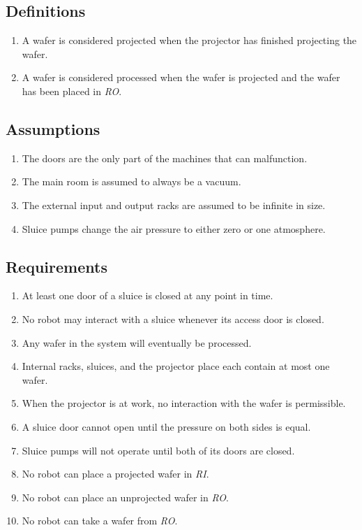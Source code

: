 \subsection{Definitions}
\begin{enumerate}
  \item A wafer is considered projected when the projector has finished projecting the wafer.
  \item A wafer is considered processed when the wafer is projected and the wafer has been placed in \textit{RO}.
\end{enumerate}

\subsection{Assumptions}
\begin{enumerate}
  \item The doors are the only part of the machines that can malfunction.
  \item The main room is assumed to always be a vacuum.
  \item The external input and output racks are assumed to be infinite in size.
  \item Sluice pumps change the air pressure to either zero or one atmosphere.
\end{enumerate}

\subsection{Requirements}
\begin{enumerate}
  \item At least one door of a sluice is closed at any point in time.
  \item No robot may interact with a sluice whenever its access door is closed.
  \item Any wafer in the system will eventually be processed.
  \item Internal racks, sluices, and the projector place each contain at most one wafer.
  \item When the projector is at work, no interaction with the wafer is permissible.
  \item A sluice door cannot open until the pressure on both sides is equal.
  \item Sluice pumps will not operate until both of its doors are closed.
  \item No robot can place a projected wafer in \textit{RI}.
  \item No robot can place an unprojected wafer in \textit{RO}.
  \item No robot can take a wafer from \textit{RO}.
\end{enumerate}